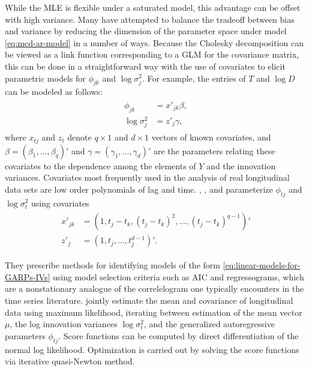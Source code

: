 \bigskip

While the MLE is flexible under a saturated model, this advantage can be offset with high variance. Many have attempted to balance the tradeoff between bias and variance by reducing the dimension of the parameter space under model \eqref{eq:mcd-ar-model} in a number of ways. Because the Cholesky decomposition can be viewed as a link function corresponding to a GLM for the covariance matrix, this can be done in a straightforward way with the use of covariates to  elicit parametric models for $\phi_{jk}$ and $\log\sigma_j^2$.  For example, the entries of $T$ and $\log D$ can be modeled as follows:
\begin{align}
\begin{split} \label{eq:linear-models-for-GARPs-IVs}
\phi_{jk} &= x'_{jk} \beta,\\
\log\sigma_j^2 &= z'_j \gamma,
\end{split}
\end{align}
\noindent
where $x_{tj}$ and $z_{t}$ denote $q \times 1$ and $d \times 1$ vectors of known covariates, and $\beta = \left(\beta_1,\dots, \beta_q \right)'$ and $\gamma = \left(\gamma_1,\dots, \gamma_d \right)'$ are the parameters relating these covariates to the dependence among the elements of $Y$ and the innovation variances. Covariates most frequently used in the analysis of real longitudinal data sets are low order polynomials of lag and time. \cite{pourahmadi1999joint}, \cite{pourahmadi2000maximum}, and \cite{pan2003modelling} parameterize $\phi_{tj}$ and $\log \sigma^2_t$ using covariates
\begin{align}
\begin{split}  \label{eq:GARP-IV-parametric-model}
x'_{jk} &= \left(1, t_j - t_k, \left(t_j - t_k\right)^2,\dots, \left(t_j - t_k\right)^{q-1}\right)' \\
z'_{j}  &= \left(1, t_j, \dots, t_j^{d-1}\right)'.
\end{split}
\end{align}

They prescribe methods for identifying models of the form \eqref{eq:linear-models-for-GARPs-IVs} using model selection criteria such as AIC and regressograms, which are a nonstationary analogue of the correlelogram one typically encounters in the time series literature. \cite{pan2003modelling} jointly estimate the mean and covariance of longitudinal data using maximum likelihood, iterating between estimation of the mean vector $\mu$, the log innovation variances $\log \sigma_{t}^2$, and the generalized autoregressive parameters $\phi_{tj}$. Score functions can be computed by direct differentiation of the normal log likelihood. Optimization is carried out by solving the score functions via iterative quasi-Newton method. 

